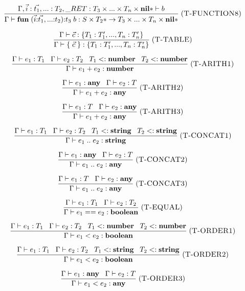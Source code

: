 \[
\frac{\env, \vec{i}:\vec{t_{1}}, {...}:T_{2},
      \ret:T_{3} \times ... \times T_{n} \times \Nil{*} \vdash b}
     {\env \vdash \mathbf{fun} \; (\vec{i}{:}\vec{t_{1}},{...}{:}t_{2}){:}t_{3} \; b :
      S \times T_{2}* \rightarrow T_{3} \times ... \times T_{n} \times \Nil{*}}
\mylabel{T-FUNCTION8}
\]

\[
\frac{\Gamma \vdash \vec{c} : \{ T_{1}:T_{1}', ..., T_{n}:T_{n}' \}}
     {\Gamma \vdash \{ \; \vec{c} \; \} : \{ T_{1}:T_{1}', ..., T_{n}:T_{n}' \}}
\; (\textsc{T-TABLE})
\]

\[
\frac{\Gamma \vdash e_{1}:T_{1} \;\;\;
      \Gamma \vdash e_{2}:T_{2} \;\;\;
      T_{1} <: \mathbf{number} \;\;\;
      T_{2} <: \mathbf{number}}
     {\Gamma \vdash e_{1} + e_{2} : \mathbf{number}}
\; (\textsc{T-ARITH1})
\]

\[
\frac{\Gamma \vdash e_{1}:\mathbf{any} \;\;\;
      \Gamma \vdash e_{2}:T}
     {\Gamma \vdash e_{1} + e_{2} : \mathbf{any}}
\; (\textsc{T-ARITH2})
\]

\[
\frac{\Gamma \vdash e_{1}:T \;\;\;
      \Gamma \vdash e_{2}:\mathbf{any}}
     {\Gamma \vdash e_{1} + e_{2} : \mathbf{any}}
\; (\textsc{T-ARITH3})
\]

\[
\frac{\Gamma \vdash e_{1}:T_{1} \;\;\;
      \Gamma \vdash e_{2}:T_{2} \;\;\;
      T_{1} <: \mathbf{string} \;\;\;
      T_{2} <: \mathbf{string}}
     {\Gamma \vdash e_{1} \; {..} \; e_{2} : \mathbf{string}}
\; (\textsc{T-CONCAT1})
\]

\[
\frac{\Gamma \vdash e_{1}:\mathbf{any} \;\;\;
      \Gamma \vdash e_{2}:T}
     {\Gamma \vdash e_{1} \; {..} \; e_{2} : \mathbf{any}}
\; (\textsc{T-CONCAT2})
\]

\[
\frac{\Gamma \vdash e_{1}:T \;\;\;
      \Gamma \vdash e_{2}:\mathbf{any}}
     {\Gamma \vdash e_{1} \; {..} \; e_{2} : \mathbf{any}}
\; (\textsc{T-CONCAT3})
\]

\[
\frac{\Gamma \vdash e_{1}:T_{1} \;\;\;
      \Gamma \vdash e_{2}:T_{2}}
     {\Gamma \vdash e_{1} == e_{2} : \mathbf{boolean}}
\; (\textsc{T-EQUAL})
\]

\[
\frac{\Gamma \vdash e_{1}:T_{1} \;\;\;
      \Gamma \vdash e_{2}:T_{2} \;\;\;
      T_{1} <: \mathbf{number} \;\;\;
      T_{2} <: \mathbf{number}}
     {\Gamma \vdash e_{1} < e_{2} : \mathbf{boolean}}
\; (\textsc{T-ORDER1})
\]

\[
\frac{\Gamma \vdash e_{1}:T_{1} \;\;\;
      \Gamma \vdash e_{2}:T_{2} \;\;\;
      T_{1} <: \mathbf{string} \;\;\;
      T_{2} <: \mathbf{string}}
     {\Gamma \vdash e_{1} < e_{2} : \mathbf{boolean}}
\; (\textsc{T-ORDER2})
\]

\[
\frac{\Gamma \vdash e_{1}:\mathbf{any} \;\;\;
      \Gamma \vdash e_{2}:T}
     {\Gamma \vdash e_{1} < e_{2} : \mathbf{any}}
\; (\textsc{T-ORDER3})
\]


